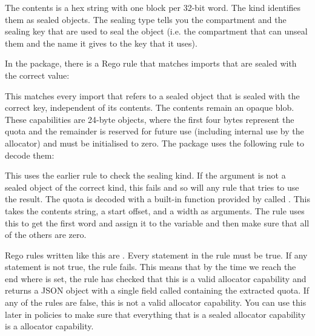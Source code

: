 {\begin{jsonsnippet}
{
  "contents": "00040000 00000000 00000000 00000000 00000000 00000000",
  "kind": "SealedObject",
  "sealing_type": {
    "compartment": "allocator",
    "key": "MallocKey",
    "provided_by": "build/cheriot/cheriot/release/cheriot.allocator.compartment",
    "symbol": "__export.sealing_type.allocator.MallocKey"
  \}
\}
\end{jsonsnippet}

The contents is a hex string with one block per 32-bit word.
The kind identifies them as sealed objects.
The sealing type tells you the compartment and the sealing key that are used to seal the object (i.e. the compartment that can unseal them and the name it gives to the key that it uses).

In the  package, there is a Rego rule that matches imports that are sealed with the correct value:

\regolisting[filename=examples/auditing-rtos/rtos.rego,marker=isallocator,label=lst:isallocatorrego,caption="The Rego rule for matching objects sealed as allocator capabilities"]{}

This matches every import that refers to a sealed object that is sealed with the correct key, independent of its contents.
The contents remain an opaque blob.
These capabilities are 24-byte objects, where the first four bytes represent the quota and the remainder is reserved for future use (including internal use by the allocator) and must be initialised to zero.
The  package uses the following rule to decode them:

\regolisting[filename=examples/auditing-rtos/rtos.rego,marker=decodeallocator,label=lst:decodeallocatorrego,caption="The Rego rule for decoding allocator capabilities"]{}

This uses the earlier rule to check the sealing kind.
If the argument is not a sealed object of the correct kind, this fails and so will any rule that tries to use the result.
The quota is decoded with a built-in function provided by  called .
This takes the contents string, a start offset, and a width as arguments.
The rule uses this to get the first word and assign it to the  variable and then make sure that all of the others are zero.

Rego rules written like this are .
Every statement in the rule must be true.
If any statement is not true, the rule fails.
This means that by the time we reach the end where  is set, the rule has checked that this is a valid allocator capability and returns a JSON object with a single field called  containing the extracted quota.
If any of the rules are false, this is not a valid allocator capability.
You can use this later in policies to make sure that everything that is a sealed allocator capability is a  allocator capability.

}
